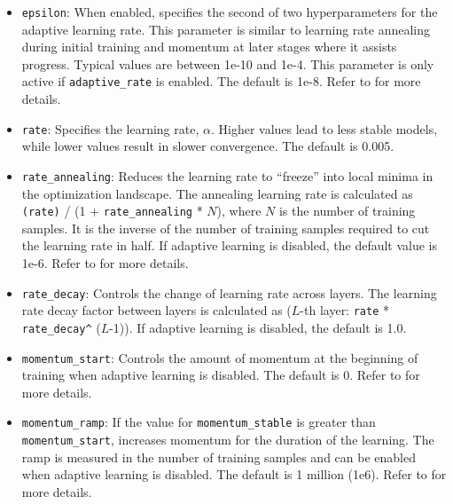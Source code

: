 {{{\begin{itemize}
\item \texttt{epsilon}: When enabled, specifies the second of two hyperparameters for the adaptive learning rate. This parameter is similar to learning rate annealing during initial training and momentum at later stages where it assists progress. Typical values are between 1e-10 and 1e-4. This parameter is only active if \texttt{adaptive\_rate} is enabled. The default is 1e-8. %
Refer to {\textbf{}} for more details.

\item \texttt{rate}: Specifies the learning rate, $\alpha$. Higher values lead to less stable models, while lower values result in slower convergence. The default is 0.005.  %

\item \texttt{rate\_annealing}: Reduces the learning rate to ``freeze'' into local minima in the optimization landscape. The annealing learning rate is calculated as \texttt{(rate)} / (1 + \texttt{rate\_annealing} * $N$), where $N$ is the number of training samples.  It is the inverse of the number of training samples required to cut the learning rate in half.  If adaptive learning is disabled, the default value is 1e-6. Refer to {\textbf{}} for more details.

\item \texttt{rate\_decay}:  Controls the change of learning rate across layers. The learning rate decay factor between layers is calculated as ($L$-th layer: \texttt{rate} * \texttt{rate\_decay\^} ($L$-1)). If adaptive learning is disabled, the default is 1.0. 

\item \texttt{momentum\_start}: Controls the amount of momentum at the beginning of training when adaptive learning is disabled. The default is 0. Refer to {\textbf{}} for more details.

\item \texttt{momentum\_ramp}: If the value for \texttt{momentum\_stable} is greater than\\ \texttt{momentum\_start}, increases momentum for the duration of the learning.  The ramp is measured in the number of training samples and can be enabled when adaptive learning is disabled. The default is 1 million (1e6). Refer to {\textbf{}} for more details.


\end{itemize}}}}
